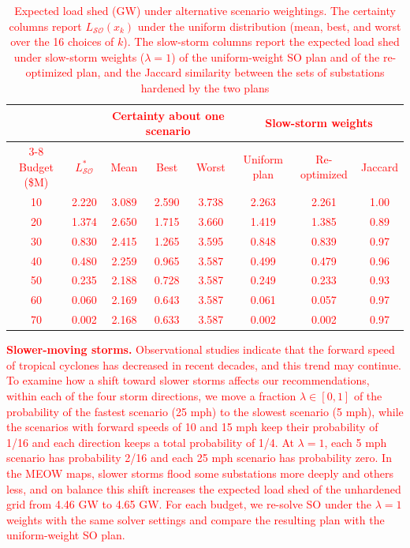 \documentclass[authoryear,preprint,review,12pt]{elsarticle}\usepackage{amssymb}
\begin{document}
\begin{table}[htbp]
    \centering
    \caption{\textcolor{red}{Expected load shed (GW) under alternative scenario weightings. The certainty columns report $L_{\mathcal{SO}}(x_k)$ under the uniform distribution (mean, best, and worst over the 16 choices of $k$). The slow-storm columns report the expected load shed under slow-storm weights ($\lambda=1$) of the uniform-weight SO plan and of the re-optimized plan, and the Jaccard similarity between the sets of substations hardened by the two plans}}
    \vspace{0.5em}
    \textcolor{red}{
    \begin{tabular}{|c|c|c|c|c|c|c|c|}
        \hline
         & & \multicolumn{3}{c|}{Certainty about one scenario} & \multicolumn{3}{c|}{Slow-storm weights} \\
        \cline{3-8}
        Budget (\$M) & $L^*_{\mathcal{SO}}$ & Mean & Best & Worst & Uniform plan & Re-optimized & Jaccard \\
        \hline
        10 & 2.220 & 3.089 & 2.590 & 3.738 & 2.263 & 2.261 & 1.00 \\
        20 & 1.374 & 2.650 & 1.715 & 3.660 & 1.419 & 1.385 & 0.89 \\
        30 & 0.830 & 2.415 & 1.265 & 3.595 & 0.848 & 0.839 & 0.97 \\
        40 & 0.480 & 2.259 & 0.965 & 3.587 & 0.499 & 0.479 & 0.96 \\
        50 & 0.235 & 2.188 & 0.728 & 3.587 & 0.249 & 0.233 & 0.93 \\
        60 & 0.060 & 2.169 & 0.643 & 3.587 & 0.061 & 0.057 & 0.97 \\
        70 & 0.002 & 2.168 & 0.633 & 3.587 & 0.002 & 0.002 & 0.97 \\
        \hline
    \end{tabular}
    }
    \label{tab:sensitivity}
\end{table}

\textcolor{red}{\textbf{Slower-moving storms.} Observational studies indicate that the forward speed of tropical cyclones has decreased in recent decades, and this trend may continue. To examine how a shift toward slower storms affects our recommendations, within each of the four storm directions, we move a fraction $\lambda \in [0,1]$ of the probability of the fastest scenario (25 mph) to the slowest scenario (5 mph), while the scenarios with forward speeds of 10 and 15 mph keep their probability of 1/16 and each direction keeps a total probability of 1/4. At $\lambda = 1$, each 5 mph scenario has probability 2/16 and each 25 mph scenario has probability zero. In the MEOW maps, slower storms flood some substations more deeply and others less, and on balance this shift increases the expected load shed of the unhardened grid from 4.46 GW to 4.65 GW. For each budget, we re-solve SO under the $\lambda = 1$ weights with the same solver settings and compare the resulting plan with the uniform-weight SO plan.}
\end{document}
